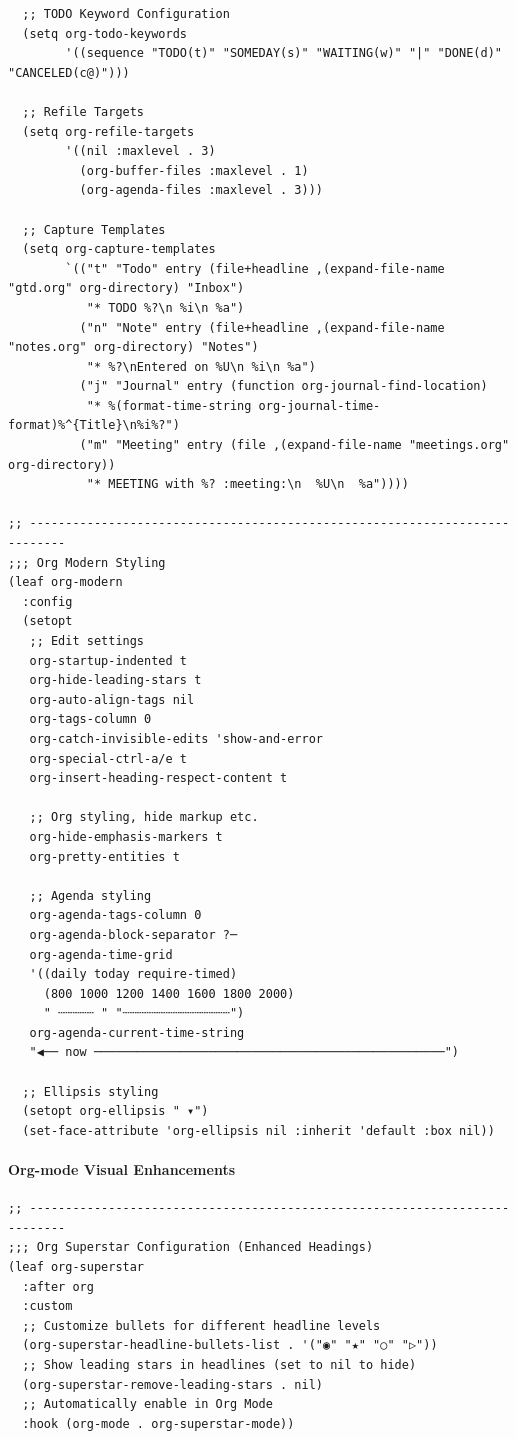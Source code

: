 \documentclass[11pt]{article}
\begin{document}
\begin{verbatim}
  ;; TODO Keyword Configuration
  (setq org-todo-keywords
        '((sequence "TODO(t)" "SOMEDAY(s)" "WAITING(w)" "|" "DONE(d)" "CANCELED(c@)")))

  ;; Refile Targets
  (setq org-refile-targets
        '((nil :maxlevel . 3)
          (org-buffer-files :maxlevel . 1)
          (org-agenda-files :maxlevel . 3)))

  ;; Capture Templates
  (setq org-capture-templates
        `(("t" "Todo" entry (file+headline ,(expand-file-name "gtd.org" org-directory) "Inbox")
           "* TODO %?\n %i\n %a")
          ("n" "Note" entry (file+headline ,(expand-file-name "notes.org" org-directory) "Notes")
           "* %?\nEntered on %U\n %i\n %a")
          ("j" "Journal" entry (function org-journal-find-location)
           "* %(format-time-string org-journal-time-format)%^{Title}\n%i%?")
          ("m" "Meeting" entry (file ,(expand-file-name "meetings.org" org-directory))
           "* MEETING with %? :meeting:\n  %U\n  %a"))))

;; ---------------------------------------------------------------------------
;;; Org Modern Styling
(leaf org-modern
  :config
  (setopt
   ;; Edit settings
   org-startup-indented t
   org-hide-leading-stars t
   org-auto-align-tags nil
   org-tags-column 0
   org-catch-invisible-edits 'show-and-error
   org-special-ctrl-a/e t
   org-insert-heading-respect-content t

   ;; Org styling, hide markup etc.
   org-hide-emphasis-markers t
   org-pretty-entities t

   ;; Agenda styling
   org-agenda-tags-column 0
   org-agenda-block-separator ?─
   org-agenda-time-grid
   '((daily today require-timed)
     (800 1000 1200 1400 1600 1800 2000)
     " ┄┄┄┄┄ " "┄┄┄┄┄┄┄┄┄┄┄┄┄┄┄")
   org-agenda-current-time-string
   "◀── now ─────────────────────────────────────────────────")

  ;; Ellipsis styling
  (setopt org-ellipsis " ▾")
  (set-face-attribute 'org-ellipsis nil :inherit 'default :box nil))
\end{verbatim}
\paragraph{Org-mode Visual Enhancements}
\label{sec:orgca8f3c9}

\begin{verbatim}
;; ---------------------------------------------------------------------------
;;; Org Superstar Configuration (Enhanced Headings)
(leaf org-superstar
  :after org
  :custom
  ;; Customize bullets for different headline levels
  (org-superstar-headline-bullets-list . '("◉" "★" "○" "▷"))
  ;; Show leading stars in headlines (set to nil to hide)
  (org-superstar-remove-leading-stars . nil)
  ;; Automatically enable in Org Mode
  :hook (org-mode . org-superstar-mode))
\end{verbatim}
\end{document}
